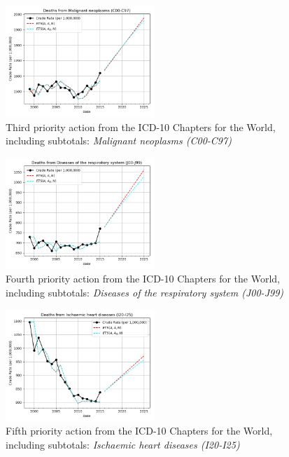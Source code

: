 \documentclass[10pt, a4paper, twocolumn]{IEEEconf}
\begin{document}
\begin{figure}[H]
  \centering
  \includegraphics[width=0.5\textwidth]{results/WORLD_ICD10_CHAPTERS_ALL/Malignant_neoplasms_C00-C97_ets.png}
  \caption{Third priority action from the ICD-10 Chapters for the World, including subtotals: \textit{Malignant neoplasms (C00-C97)}}\label{fig:k9c}
\end{figure}

\begin{figure}[H]
  \centering
  \includegraphics[width=0.5\textwidth]{results/WORLD_ICD10_CHAPTERS_ALL/Diseases_of_the_respiratory_system_J00-J99_ets.png}
  \caption{Fourth priority action from the ICD-10 Chapters for the World, including subtotals: \textit{Diseases of the respiratory system (J00-J99)}}\label{fig:k9d}
\end{figure}

\begin{figure}[H]
  \centering
  \includegraphics[width=0.5\textwidth]{results/WORLD_ICD10_CHAPTERS_ALL/Ischaemic_heart_diseases_I20-I25_ets.png}
  \caption{Fifth priority action from the ICD-10 Chapters for the World, including subtotals: \textit{Ischaemic heart diseases (I20-I25)}}\label{fig:k9e}
\end{figure}
\end{document}
